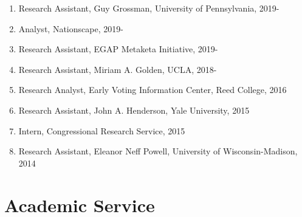 \documentclass[11pt]{article}
\begin{document}
\begin{enumerate}[topsep = 0pt, itemsep = 1ex, partopsep  = 1ex, parsep = 1ex]

	\item[] Research Assistant, Guy Grossman, University of Pennsylvania, 2019-

	\item[] Analyst, Nationscape, 2019-
	
	\item[] Research Assistant, EGAP Metaketa Initiative, 2019-
	
	\item[] Research Assistant, Miriam A. Golden, UCLA, 2018-
	
	\item[] Research Analyst, Early Voting Information Center, Reed College, 2016
	
	\item[] Research Assistant, John A. Henderson, Yale University, 2015
	
	\item[] Intern, Congressional Research Service, 2015
	
	\item[] Research Assistant, Eleanor Neff Powell, University of Wisconsin-Madison, 2014
	
\end{enumerate}

\section*{Academic Service} 
\end{document}
